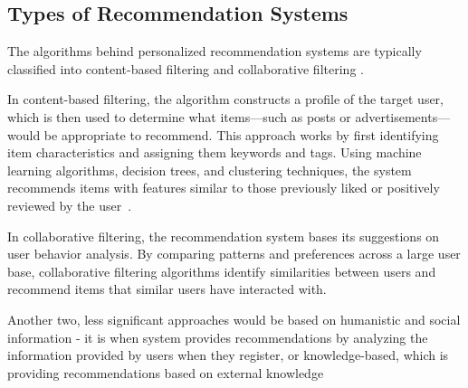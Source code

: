 \documentclass[10pt,twocolumn,twoside,a4paper]{report} %
\begin{document}
\subsection{Types of Recommendation Systems}
The algorithms behind personalized recommendation systems are typically classified into content-based filtering and collaborative filtering \cite{raghavendra2018personalized}.

In content-based filtering, the algorithm constructs a profile of the target user, which is then used to determine what items—such as posts or advertisements—would be appropriate to recommend. This approach works by first identifying item characteristics and assigning them keywords and tags. Using machine learning algorithms, decision trees, and clustering techniques, the system recommends items with features similar to those previously liked or positively reviewed by the user~\cite{raghavendra2018personalized}\cite{contentvscollaborative}.

In collaborative filtering, the recommendation system bases its suggestions on user behavior analysis. By comparing patterns and preferences across a large user base, collaborative filtering algorithms identify similarities between users and recommend items that similar users have interacted with.

Another two, less significant approaches would be based on humanistic and social information - it is when system provides recommendations by
analyzing the information provided by users when they register, or knowledge-based, which is providing recommendations based on external knowledge
\end{document}
